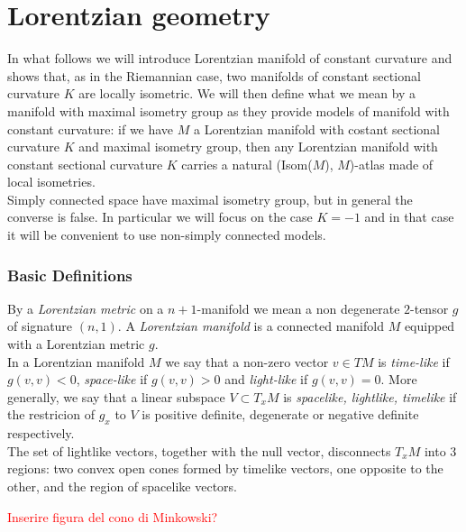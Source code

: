 \chapter{Lorentzian geometry}

In what follows we will introduce Lorentzian manifold of constant curvature and shows that, as in the Riemannian case, two manifolds of constant sectional curvature $K$ are locally isometric. We will then define what we mean by a manifold with maximal isometry group as they provide models of manifold with constant curvature: if we have $M$ a Lorentzian manifold with costant sectional curvature $K$ and maximal isometry group, then any Lorentzian manifold with constant sectional curvature $K$ carries a natural (Isom($M$), $M$)-atlas made of local isometries. \\
Simply connected space have maximal isometry group, but in general the converse is false. In particular we will focus on the case $K=-1$ and in that case it will be convenient to use non-simply connected models. 

\subsection{Basic Definitions}
By a \textit{Lorentzian metric} on a $n+1$-manifold we mean a non degenerate $2$-tensor $g$ of signature $(n,1)$. A \textit{Lorentzian manifold} is a connected manifold $M$ equipped with a Lorentzian metric $g$.\\
In a Lorentzian manifold $M$ we say that a non-zero vector $v \in TM$ is \textit{time-like} if $g(v,v)<0$, \textit{space-like} if $g(v,v)>0$ and \textit{light-like} if $g(v,v)=0$. More generally, we say that a linear subspace $V \subset T_{x}M$ is \textit{spacelike, lightlike, timelike} if the restricion of $g_x$ to $V$ is positive definite, degenerate or negative definite respectively.\\
The set of lightlike vectors, together with the null vector, disconnects $T_{x}M$ into 3 regions: two convex open cones formed by timelike vectors, one opposite to the other, and the region of spacelike vectors. 

\textcolor{red}{Inserire figura del cono di Minkowski?}

